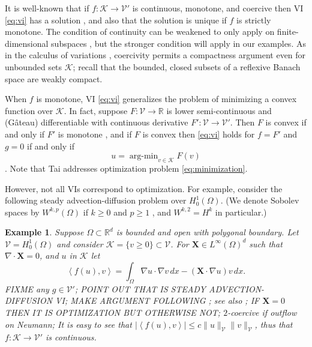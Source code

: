 \documentclass[letterpaper,final,12pt,reqno]{amsart}
\theoremstyle{cstyle}
\theoremstyle{dstyle}
\newtheorem{example}[theorem]{Example}
\numberwithin{equation}{section}
\numberwithin{figure}{section}
\numberwithin{table}{section}
\numberwithin{theorem}{section}
\newcommand{\RR}{\mathbb{R}}
\newcommand{\grad}{\nabla}
\newcommand{\Div}{\nabla\cdot}
\newcommand{\bX}{\mathbf{X}}
\newcommand{\cK}{\mathcal{K}}
\newcommand{\cV}{\mathcal{V}}
\newcommand{\ip}[2]{\left<#1,#2\right>}
\begin{document}
It is well-known that if $f:\cK \to \cV'$ is continuous, monotone, and coercive then VI \eqref{eq:vi} has a solution \cite[Corollary III.1.8]{KinderlehrerStampacchia1980}, and also that the solution is unique if $f$ is strictly monotone.  The condition of continuity can be weakened to only apply on finite-dimensional subspaces \cite{KinderlehrerStampacchia1980}, but the stronger condition will apply in our examples.  As in the calculus of variations \cite{Evans2010}, coercivity permits a compactness argument even for unbounded sets $\cK$; recall that the bounded, closed subsets of a reflexive Banach space are weakly compact.

When $f$ is monotone, VI \eqref{eq:vi} generalizes the problem of minimizing a convex function over $\cK$.  In fact, suppose $F:\cV \to \RR$ is lower semi-continuous and (G\^ateau) differentiable with continuous derivative $F':\cV \to \cV'$.  Then $F$ is convex if and only if $F'$ is monotone \cite[Proposition I.5.5]{EkelandTemam1976}, and if $F$ is convex then \eqref{eq:vi} holds for $f=F'$ and $g=0$ if and only if
\begin{equation}
u = \operatorname{arg-min}_{v\in\cK} F(v) \label{eq:minimization}
\end{equation}
\cite[Proposition II.2.1]{EkelandTemam1976}.  Note that Tai \cite{Tai2003} addresses optimization problem \eqref{eq:minimization}.

However, not all VIs correspond to optimization.  For example, consider the following steady advection-diffusion problem over $H_0^1(\Omega)$.  (We denote Sobolev spaces by $W^{k,p}(\Omega)$ if $k\ge 0$ and $p\ge 1$ \cite{Evans2010}, and $W^{k,2}=H^k$ in particular.)

\begin{example}  \label{ex:advectiondiffusion}  Suppose $\Omega \subset \RR^d$ is bounded and open with polygonal boundary.  Let $\cV = H_0^1(\Omega)$ and consider $\cK = \{v\ge 0\} \subset \cV$.  For $\bX \in L^\infty(\Omega)^d$ such that $\Div \bX=0$, and $u$ in $\cK$ let
\begin{equation}
\ip{f(u)}{v} = \int_\Omega \grad u \cdot \grad v\,dx - (\bX \cdot \grad u) v\,dx. \label{eq:nongradientexample}
\end{equation}
FIXME any $g\in\cV'$; POINT OUT THAT IS STEADY ADVECTION-DIFFUSION VI; MAKE ARGUMENT FOLLOWING \cite{Elmanetal2014}; see also \cite{Kirby2010}; IF $\bX=0$ THEN IT IS OPTIMIZATION BUT OTHERWISE NOT; $2$-coercive if outflow on Neumann; It is easy to see that $|\ip{f(u)}{v}| \le c \|u\|_{\cV} \|v\|_{\cV}$, thus that $f:\cK \to \cV'$ is continuous.
\end{example}
\end{document}
